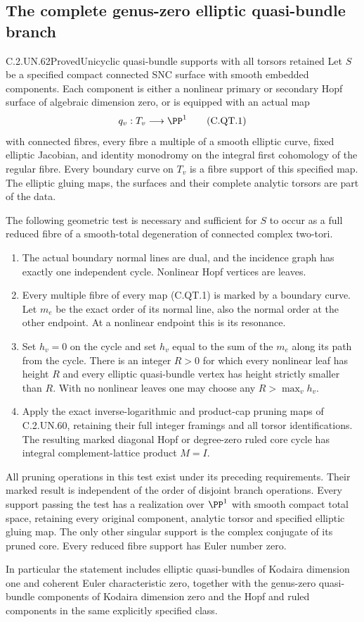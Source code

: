 \subsection{The complete genus-zero elliptic quasi-bundle branch}

\begin{statement}{C.2.UN.62}{Proved}{Unicyclic quasi-bundle supports with all torsors retained}
Let $S$ be a specified compact connected SNC surface with smooth
embedded components. Each component is either a nonlinear primary
or secondary Hopf surface of algebraic dimension zero, or is
equipped with an actual map
\[
                         q_v:T_v\longrightarrow\PP^1
\tag{C.QT.1}
\]
with connected fibres, every fibre a multiple of a smooth elliptic
curve, fixed elliptic Jacobian, and identity monodromy on the
integral first cohomology of the regular fibre. Every boundary
curve on $T_v$ is a fibre support of this specified map. The
elliptic gluing maps, the surfaces and their complete analytic
torsors are part of the data.

The following geometric test is necessary and sufficient for
$S$ to occur as a full reduced fibre of a smooth-total
degeneration of connected complex two-tori.
\begin{enumerate}
\item The actual boundary normal lines are dual, and the incidence
graph has exactly one independent cycle. Nonlinear Hopf vertices
are leaves.
\item Every multiple fibre of every map (C.QT.1) is marked by
a boundary curve. Let $m_e$ be the exact order of its normal
line, also the normal order at the other endpoint. At a
nonlinear endpoint this is its resonance.
\item Set $h_v=0$ on the cycle and set $h_v$ equal to the sum
of the $m_e$ along its path from the cycle. There is an integer
$R>0$ for which every nonlinear leaf has height $R$ and every
elliptic quasi-bundle vertex has height strictly smaller than
$R$. With no nonlinear leaves one may choose any
$R>\max_v h_v$.
\item Apply the exact inverse-logarithmic and product-cap
pruning maps of C.2.UN.60, retaining their full integer
framings and all torsor identifications. The resulting
marked diagonal Hopf or degree-zero ruled core cycle has
integral complement-lattice product $M=I$.
\end{enumerate}
All pruning operations in this test exist under its preceding
requirements. Their marked result is independent of the order
of disjoint branch operations. Every support passing the test
has a realization over $\PP^1$ with smooth compact total space,
retaining every original component, analytic torsor and
specified elliptic gluing map. The only other singular support
is the complex conjugate of its pruned core. Every reduced
fibre support has Euler number zero.

In particular the statement includes elliptic quasi-bundles
of Kodaira dimension one and coherent Euler characteristic
zero, together with the genus-zero quasi-bundle components
of Kodaira dimension zero and the Hopf and ruled components
in the same explicitly specified class.
\end{statement}

